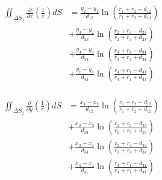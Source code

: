 \begin{align}
    \begin{split}
        \label{eq:partial_r_x}
        \iint_{\Delta S_j} \frac{\partial}{\partial x}\left(\frac{1}{r}\right) dS &=\frac{y_{2}-y_{1}}{d_{12}} \ln \left(\frac{r_{1}+r_{2}-d_{12}}{r_{1}+r_{2}+d_{12}}\right)\\ 
        &+ \frac{y_{3}-y_{2}}{d_{23}} \ln \left(\frac{r_{2}+r_{3}-d_{23}}{r_{2}+r_{3}+d_{23}}\right)\\ &+\frac{y_{4}-y_{3}}{d_{34}} \ln \left(\frac{r_{3}+r_{4}-d_{34}}{r_{3}+r_{4}+d_{34}}\right)\\
        &+\frac{y_{1}-y_{4}}{d_{41}} \ln \left(\frac{r_{4}+r_{1}-d_{41}}{r_{4}+r_{1}+d_{41}}\right)
    \end{split}
\end{align}

\begin{align}
    \begin{split}
        \label{eq:partial_r_y}
        \iint_{\Delta S_j} \frac{\partial}{\partial y}\left(\frac{1}{r}\right) dS
        &= \frac{x_{1}-x_{2}}{d_{12}} \ln \left(\frac{r_{1}+r_{2}-d_{12}}{r_{1}+r_{2}+d_{12}}\right)\\ &+\frac{x_{2}-x_{3}}{d_{23}} \ln \left(\frac{r_{2}+r_{3}-d_{23}}{r_{2}+r_{3}+d_{23}}\right) \\
        &+\frac{x_{3}-x_{4}}{d_{34}} \ln \left(\frac{r_{3}+r_{4}-d_{34}}{r_{3}+r_{4}+d_{34}}\right)\\ &+\frac{x_{4}-x_{1}}{d_{41}} \ln \left(\frac{r_{4}+r_{1}-d_{41}}{r_{4}+r_{1}+d_{41}}\right)
    \end{split}
\end{align}

